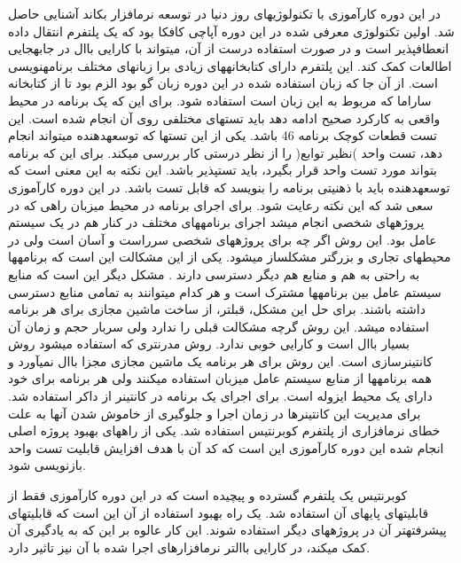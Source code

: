 \documentclass[a4]{report}
\begin{document}
در این دوره کارآموزی با تکنولوژیهای روز دنیا در توسعه نرمافزار بکاند آشنایی حاصل شد. اولین تکنولوژی
معرفی شده در این دوره آپاچی کافکا بود که یک پلتفرم انتقال داده انعطافپذیر است و در صورت استفاده درست
از آن، میتواند با کارایی باال در جابهجایی اطالعات کمک کند. این پلتفرم دارای کتابخانههای زیادی برا زبانهای
مختلف برنامهنویسی است. از آن جا که زبان استفاده شده در این دوره زبان گو بود الزم بود تا از کتابخانه ساراما
که مربوط به این زبان است استفاده شود.
 برای این که یک برنامه در محیط واقعی به کارکرد صحیح ادامه دهد باید تستهای مختلفی روی آن انجام شده
است. این تست قطعات کوچک برنامه 46 باشد. یکی از این تستها که توسعهدهنده میتواند انجام دهد، تست واحد
)نظیر توابع( را از نظر درستی کار بررسی میکند. برای این که برنامه بتواند مورد تست واحد قرار بگیرد، باید
تستپذیر باشد. این نکته به این معنی است که توسعهدهنده باید با ذهنیتی برنامه را بنویسد که قابل تست باشد.
در این دوره کارآموزی سعی شد که این نکته رعایت شود.
 برای اجرای برنامه در محیط میزبان راهی که در پروژههای شخصی انجام میشد اجرای برنامههای مختلف در
کنار هم در یک سیستم عامل بود. این روش اگر چه برای پروژههای شخصی سرراست و آسان است ولی در
محیطهای تجاری و بزرگتر مشکلساز میشود. یکی از این مشکالت این است که برنامهها به راحتی به هم و
منابع هم دیگر دسترسی دارند . مشکل دیگر این است که منابع سیستم عامل بین برنامهها مشترک است و هر
کدام میتوانند به تمامی منابع دسترسی داشته باشند. برای حل این مشکل، قبلتر، از ساخت ماشین مجازی برای
هر برنامه استفاده میشد. این روش گرچه مشکالت قبلی را ندارد ولی سربار حجم و زمان آن بسیار باال است و
کارایی خوبی ندارد. روش مدرنتری که استفاده میشود روش کانتینرسازی است. این روش برای هر برنامه یک
ماشین مجازی مجزا باال نمیآورد و همه برنامهها از منابع سیستم عامل میزبان استفاده میکنند ولی هر برنامه
برای خود دارای یک محیط ایزوله است. برای اجرای یک برنامه در کانتینر از داکر استفاده شد. برای مدیریت این
کانتینرها در زمان اجرا و جلوگیری از خاموش شدن آنها به علت خطای نرمافزاری از پلتفرم کوبرنتیس استفاده
شد.
 یکی از راههای بهبود پروژه اصلی انجام شده این دوره کارآموزی این است که کد آن با هدف افزایش قابلیت
تست واحد بازنویسی شود.

کوبرنتیس یک پلتفرم گسترده و پیچیده است که در این دوره کارآموزی فقط از قابلیتهای پایهای آن استفاده
شد. یک راه بهبود استفاده از آن این است که قابلیتهای پیشرفتهتر آن در پروژههای دیگر استفاده شوند. این کار
عالوه بر این که به یادگیری آن کمک میکند، در کارایی باالتر نرمافزارهای اجرا شده با آن نیز تاثیر دارد.
\end{document}
